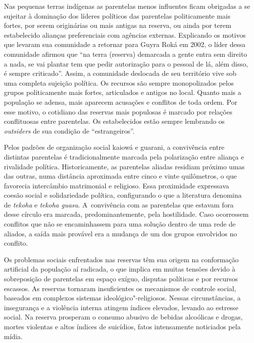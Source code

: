 Nas pequenas terras indígenas as parentelas menos influentes ficam
obrigadas a se sujeitar à dominação dos líderes políticos das
parentelas politicamente mais fortes, por serem originárias ou mais
antigas na reserva, ou ainda por terem estabelecido alianças
preferenciais com agências externas. Explicando os motivos que levaram
sua comunidade a retornar para Guyra Roká em 2002, o líder dessa
comunidade afirmou que ``na terra (reserva) demarcada a gente entra sem
direito a nada, se vai plantar tem que pedir autorização para o pessoal
de lá, além disso, é sempre criticado''. Assim, a comunidade deslocada
de seu território vive sob uma completa sujeição política. Os recursos
são sempre monopolizados pelos grupos politicamente mais fortes,
articulados e antigos no local. Quanto mais a população se adensa, mais
aparecem acusações e conflitos de toda ordem. Por esse motivo, o
cotidiano das reservas mais populosas é marcado por relações
conflituosas entre parentelas. Os estabelecidos estão sempre lembrando
os \emph{outsiders} de sua condição de ``estrangeiros''. 

Pelos padrões de organização social kaiowá e guarani, a convivência
entre distintas parentelas é tradicionalmente marcada pela polarização
entre aliança e rivalidade política. Historicamente, as parentelas
aliadas residiam próximo umas das outras, numa distância aproximada
entre cinco e vinte quilômetros, o que favorecia intercâmbio
matrimonial e religioso. Essa proximidade expressava coesão social e
solidariedade política, configurando o que a literatura denomina de
\emph{tekoha} e \emph{tekoha guasu}. A~convivência com as parentelas que estavam fora
desse círculo era marcada, predominantemente, pela hostilidade. Caso
ocorressem conflitos que não se encaminhassem para uma solução dentro
de uma rede de aliados, a saída mais provável era a mudança de um dos
grupos envolvidos no conflito.

Os problemas sociais enfrentados nas reservas têm sua origem na
conformação artificial da população aí radicada, o que implica em
muitas tensões devido à sobreposição de parentelas em espaço exíguo,
disputas políticas e por recursos escassos. As reservas tornaram
insuficientes os mecanismos de controle social, baseados em complexos
sistemas ideológico"-religiosos. Nessas circunstâncias, a insegurança e
a violência interna atingem índices elevados, levando ao estresse
social. Na reserva prosperam o consumo abusivo de bebidas alcoólicas e
drogas, mortes violentas e altos índices de suicídios, fatos
intensamente noticiados pela mídia.

